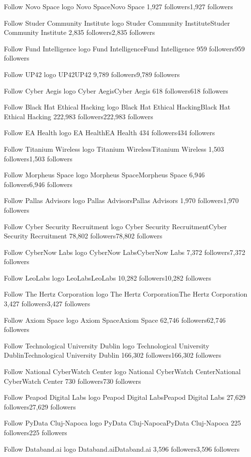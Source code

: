 Follow
Novo Space logo
Novo SpaceNovo Space
1,927 followers1,927 followers

Follow
Studer Community Institute logo
Studer Community InstituteStuder Community Institute
2,835 followers2,835 followers

Follow
Fund Intelligence logo
Fund IntelligenceFund Intelligence
959 followers959 followers

Follow
UP42 logo
UP42UP42
9,789 followers9,789 followers

Follow
Cyber Aegis logo
Cyber AegisCyber Aegis
618 followers618 followers

Follow
Black Hat Ethical Hacking logo
Black Hat Ethical HackingBlack Hat Ethical Hacking
222,983 followers222,983 followers

Follow
EA Health logo
EA HealthEA Health
434 followers434 followers

Follow
Titanium Wireless logo
Titanium WirelessTitanium Wireless
1,503 followers1,503 followers

Follow
Morpheus Space logo
Morpheus SpaceMorpheus Space
6,946 followers6,946 followers

Follow
Pallas Advisors logo
Pallas AdvisorsPallas Advisors
1,970 followers1,970 followers

Follow
Cyber Security Recruitment logo
Cyber Security RecruitmentCyber Security Recruitment
78,802 followers78,802 followers

Follow
CyberNow Labs logo
CyberNow LabsCyberNow Labs
7,372 followers7,372 followers

Follow
LeoLabs logo
LeoLabsLeoLabs
10,282 followers10,282 followers

Follow
The Hertz Corporation logo
The Hertz CorporationThe Hertz Corporation
3,427 followers3,427 followers

Follow
Axiom Space logo
Axiom SpaceAxiom Space
62,746 followers62,746 followers

Follow
Technological University Dublin logo
Technological University DublinTechnological University Dublin
166,302 followers166,302 followers

Follow
National CyberWatch Center logo
National CyberWatch CenterNational CyberWatch Center
730 followers730 followers

Follow
Peapod Digital Labs logo
Peapod Digital LabsPeapod Digital Labs
27,629 followers27,629 followers

Follow
PyData Cluj-Napoca logo
PyData Cluj-NapocaPyData Cluj-Napoca
225 followers225 followers

Follow
Databand.ai logo
Databand.aiDataband.ai
3,596 followers3,596 followers

